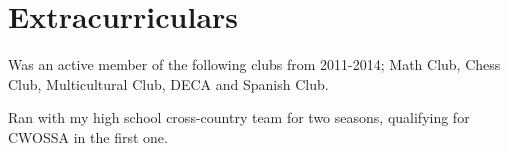 \documentclass[letterpaper]{deedy-resume}
\begin{document}
\begin{minipage}[t]{0.66\textwidth}

\section{Extracurriculars} 
\vspace{\topsep} 
\begin{tightitemize}
\item Was an active member of the following clubs from 2011-2014; Math Club, Chess Club, Multicultural Club, DECA and Spanish Club.
\item Ran with my high school cross-country team for two seasons, qualifying for CWOSSA in the first one.
\end{tightitemize}

\sectionspace 


\end{minipage} 
\end{document}

